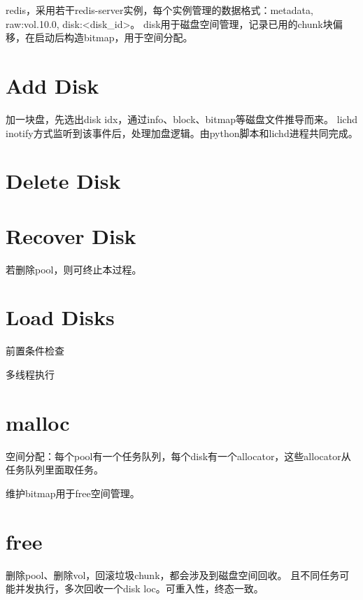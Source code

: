 redis，采用若干redis-server实例，每个实例管理的数据格式：metadata, raw:vol.10.0, disk:<disk\_id>。
disk用于磁盘空间管理，记录已用的chunk块偏移，在启动后构造bitmap，用于空间分配。

\section{Add Disk}

加一块盘，先选出disk idx，通过info、block、bitmap等磁盘文件推导而来。
lichd inotify方式监听到该事件后，处理加盘逻辑。由python脚本和lichd进程共同完成。

\section{Delete Disk}

\section{Recover Disk}

若删除pool，则可终止本过程。

\section{Load Disks}

前置条件检查

多线程执行

\section{malloc}

空间分配：每个pool有一个任务队列，每个disk有一个allocator，这些allocator从任务队列里面取任务。

维护bitmap用于free空间管理。

\section{free}

删除pool、删除vol，回滚垃圾chunk，都会涉及到磁盘空间回收。
且不同任务可能并发执行，多次回收一个disk loc。可重入性，终态一致。

